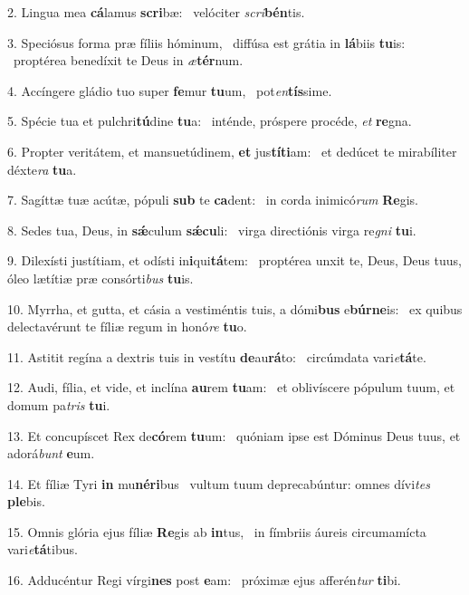 2. Lingua mea \textbf{cá}lamus \textbf{scri}bæ: \ast\  velóciter \textit{scri}\textbf{bén}tis.\

3. Speciósus forma præ fíliis hóminum, \dag\  diffúsa est grátia in \textbf{lá}biis \textbf{tu}is: \ast\  proptérea benedíxit te Deus in \textit{æ}\textbf{tér}num.\

4. Accíngere gládio tuo super \textbf{fe}mur \textbf{tu}um, \ast\  pot\textit{en}\textbf{tís}sime.\

5. Spécie tua et pulchri\textbf{tú}dine \textbf{tu}a: \ast\  inténde, próspere procéde, \textit{et} \textbf{re}gna.\

6. Propter veritátem, et mansuetúdinem, \textbf{et} jus\textbf{tí}\textbf{ti}am: \ast\  et dedúcet te mirabíliter déxte\textit{ra} \textbf{tu}a.\

7. Sagíttæ tuæ acútæ, pópuli \textbf{sub} te \textbf{ca}dent: \ast\  in corda inimicó\textit{rum} \textbf{Re}gis.\

8. Sedes tua, Deus, in \textbf{sǽ}culum \textbf{sǽ}\textbf{cu}li: \ast\  virga directiónis virga re\textit{gni} \textbf{tu}i.\

9. Dilexísti justítiam, et odísti in\textbf{i}qui\textbf{tá}tem: \ast\  proptérea unxit te, Deus, Deus tuus, óleo lætítiæ præ consórti\textit{bus} \textbf{tu}is.\

10. Myrrha, et gutta, et cásia a vestiméntis tuis, a dómi\textbf{bus} e\textbf{búr}\textbf{ne}is: \ast\  ex quibus delectavérunt te fíliæ regum in honó\textit{re} \textbf{tu}o.\

11. Astitit regína a dextris tuis in vestítu \textbf{de}au\textbf{rá}to: \ast\  circúmdata vari\textit{e}\textbf{tá}te.\

12. Audi, fília, et vide, et inclína \textbf{au}rem \textbf{tu}am: \ast\  et oblivíscere pópulum tuum, et domum pa\textit{tris} \textbf{tu}i.\

13. Et concupíscet Rex de\textbf{có}rem \textbf{tu}um: \ast\  quóniam ipse est Dóminus Deus tuus, et adorá\textit{bunt} \textbf{e}um.\

14. Et fíliæ Tyri \textbf{in} mu\textbf{né}\textbf{ri}bus \ast\  vultum tuum deprecabúntur: omnes dívi\textit{tes} \textbf{ple}bis.\

15. Omnis glória ejus fíliæ \textbf{Re}gis ab \textbf{in}tus, \ast\  in fímbriis áureis circumamícta vari\textit{e}\textbf{tá}tibus.\

16. Adducéntur Regi vírgi\textbf{nes} post \textbf{e}am: \ast\  próximæ ejus afferén\textit{tur} \textbf{ti}bi.\

